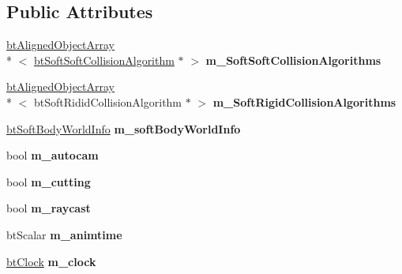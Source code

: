 \subsection*{Public Attributes}
\begin{DoxyCompactItemize}
\item 
\hypertarget{class_soft_demo_aa5b80c2de61582bf603c922a91e928f4}{\hyperlink{classbt_aligned_object_array}{bt\+Aligned\+Object\+Array}\\*
$<$ \hyperlink{classbt_soft_soft_collision_algorithm}{bt\+Soft\+Soft\+Collision\+Algorithm} $\ast$ $>$ {\bfseries m\+\_\+\+Soft\+Soft\+Collision\+Algorithms}}\label{class_soft_demo_aa5b80c2de61582bf603c922a91e928f4}

\item 
\hypertarget{class_soft_demo_a31bc1944592bb31c40bdbc9cb051bfd1}{\hyperlink{classbt_aligned_object_array}{bt\+Aligned\+Object\+Array}\\*
$<$ bt\+Soft\+Ridid\+Collision\+Algorithm $\ast$ $>$ {\bfseries m\+\_\+\+Soft\+Rigid\+Collision\+Algorithms}}\label{class_soft_demo_a31bc1944592bb31c40bdbc9cb051bfd1}

\item 
\hypertarget{class_soft_demo_a94d1342209a7accefd627e8a77bbab8e}{\hyperlink{structbt_soft_body_world_info}{bt\+Soft\+Body\+World\+Info} {\bfseries m\+\_\+soft\+Body\+World\+Info}}\label{class_soft_demo_a94d1342209a7accefd627e8a77bbab8e}

\item 
\hypertarget{class_soft_demo_abb825724a5a2cc8110494a206a1d2d71}{bool {\bfseries m\+\_\+autocam}}\label{class_soft_demo_abb825724a5a2cc8110494a206a1d2d71}

\item 
\hypertarget{class_soft_demo_ac6cfa8fd4187f28ff8eaaf779bdaa906}{bool {\bfseries m\+\_\+cutting}}\label{class_soft_demo_ac6cfa8fd4187f28ff8eaaf779bdaa906}

\item 
\hypertarget{class_soft_demo_ad21005da41ccd1f62320588b0b6909e3}{bool {\bfseries m\+\_\+raycast}}\label{class_soft_demo_ad21005da41ccd1f62320588b0b6909e3}

\item 
\hypertarget{class_soft_demo_ae37d6cae677a99ddfb56b4b26b61d828}{bt\+Scalar {\bfseries m\+\_\+animtime}}\label{class_soft_demo_ae37d6cae677a99ddfb56b4b26b61d828}

\item 
\hypertarget{class_soft_demo_aaa12191544d4e3f5d27d0f72f29e9f45}{\hyperlink{classbt_clock}{bt\+Clock} {\bfseries m\+\_\+clock}}\label{class_soft_demo_aaa12191544d4e3f5d27d0f72f29e9f45}


\end{DoxyCompactItemize}
